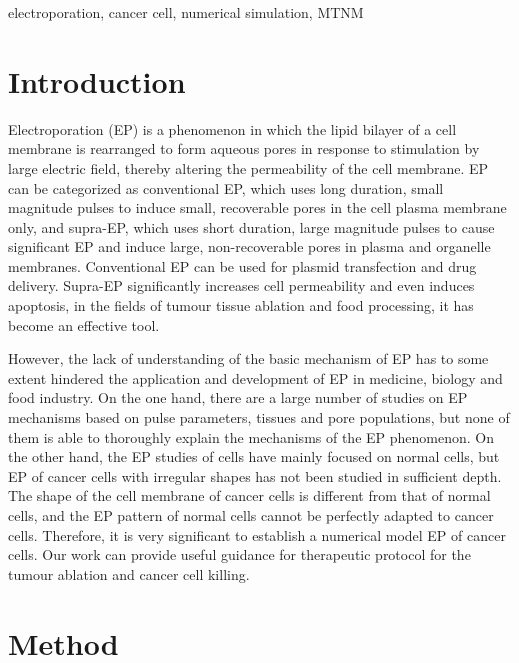 \documentclass[conference]{IEEEtran}
\begin{document}
\begin{IEEEkeywords}
electroporation, cancer cell, numerical simulation, MTNM
\end{IEEEkeywords}

\section{Introduction}
Electroporation (EP) is a phenomenon in which the lipid bilayer of a cell membrane is rearranged to form aqueous pores in response to stimulation by large electric field, thereby altering the permeability of the cell membrane\cite{kotnik2019membrane}. EP can be categorized as conventional EP, which uses long duration, small magnitude pulses to induce small, recoverable pores in the cell plasma membrane only, and supra-EP, which uses short duration, large magnitude pulses to cause significant EP and induce large, non-recoverable pores in plasma and organelle membranes. Conventional EP can be used for plasmid transfection and drug delivery\cite{b3,a2010electroporation}. Supra-EP significantly increases cell permeability and even induces apoptosis, in the fields of tumour tissue ablation and food processing, it has become an effective tool.

However, the lack of understanding of the basic mechanism of EP has to some extent hindered the application and development of EP in medicine\cite{yarmush2014electroporation}, biology\cite{cao2019nontoxic} and food industry\cite{golberg2010use}. On the one hand, there are a large number of studies on EP mechanisms based on pulse parameters, tissues and pore populations, but none of them is able to thoroughly explain the mechanisms of the EP phenomenon\cite{rebervsek2011advantages,smith2014emergence}. On the other hand, the EP studies of cells have mainly focused on normal cells, but EP of cancer cells with irregular shapes has not been studied in sufficient depth. The shape of the cell membrane of cancer cells is different from that of normal cells, and the EP pattern of normal cells cannot be perfectly adapted to cancer cells. Therefore, it is very significant to establish a numerical model EP of cancer cells. Our work can provide useful guidance for therapeutic protocol for the tumour ablation and cancer cell killing.

\section{Method}
\end{document}
